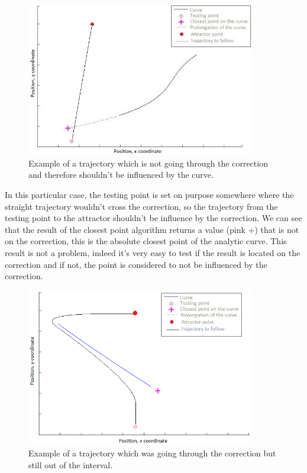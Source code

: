 \begin{figure}[H]
\centering
\includegraphics[width=10cm]{img/analytic_fail.jpg}
\caption{Example of a trajectory which is not going through the correction and therefore shouldn't be influenced by the curve.}
\label{analytic_fail}
\end{figure}

In this particular case, the testing point is set on purpose somewhere where the straight trajectory wouldn't cross the correction, so the trajectory from the testing point to the attractor shouldn't be influence by the correction. We can see that the result of the closest point algorithm returns a value (pink +) that is not on the correction, this is the absolute closest point of the analytic curve. This result is not a problem, indeed it's very easy to test if the result is located on the correction and if not, the point is considered to not be influenced by the correction.

\begin{figure}[H]
\centering
\includegraphics[width=10cm]{img/analytic_fail2.png}
\caption{Example of a trajectory which was going through the correction but still out of the interval.}
\label{analytic_fail_2}
\end{figure}

